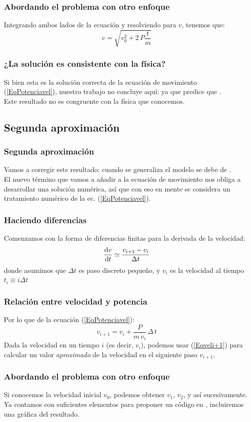 \documentclass[12pt]{beamer}
\begin{document}
\begin{frame}
\frametitle{Abordando el problema con otro enfoque}
Integrando ambos lados de la ecuación y resolviendo para $v$, tenemos que:
\pause
\begin{equation}\label{Eqvres}
v = \sqrt{v_{0}^{2} + 2 \, P \dfrac{t}{m}}
\end{equation}
\end{frame}
\begin{frame}
\frametitle{¿La solución es consistente con la física?}
Si bien esta es la solución correcta de la ecuación de movimiento (\ref{EqPotenciavel}), nuestro trabajo no concluye aquí: \pause ya que predice que .
\\
\bigskip
\pause
Este resultado no es congruente con la física que conocemos.
\end{frame}

\subsection{Segunda aproximación}

\begin{frame}
\frametitle{Segunda aproximación}
Vamos a corregir este resultado: cuando se generaliza el modelo se debe de .
\\
\bigskip
\pause
El nuevo término que vamos a añadir a la ecuación de movimiento nos obliga a desarrollar una solución numérica, así que con eso en mente se considera un tratamiento numérico de la ec. (\ref{EqPotenciavel}).
\end{frame}
\begin{frame}
\frametitle{Haciendo diferencias}
Comenzamos con la forma de diferencias finitas para la derivada de la velocidad:
\pause
\begin{equation}
\dv{v}{t} \simeq \dfrac{v_{i + 1} - v_{i}}{\Delta t}
\label{Eqderivada}
\end{equation}
donde asumimos que $\Delta t$ es paso discreto pequeño, y $v_{i}$ es la velocidad al tiempo $t_{i} \equiv i \Delta t$
\end{frame}
\begin{frame}
\frametitle{Relación entre velocidad y potencia}
Por lo que de la ecuación (\ref{EqPotenciavel}):
\pause
\begin{equation}
v_{i + 1} = v_{i} + \dfrac{P}{m \, v_{i}} \, \Delta \, t
\label{Eqveli+1}
\end{equation}
Dada la velocidad en un tiempo $i$ (es decir, $v_{i}$), podemos usar (\ref{Eqveli+1}) para calcular un valor \textit{aproximado} de la velocidad en el siguiente paso $v_{i+1}$.
\end{frame}
\begin{frame}
\frametitle{Abordando el problema con otro enfoque}
Si conocemos la velocidad inicial $v_{0}$, podemos obtener $v_{1}$, $v_{2}$, y así sucesivamente.
\\
\bigskip
\pause
Ya contamos con suficientes elementos para proponer un código en \python{}, incluiremos una gráfica del resultado.
\end{frame}
\end{document}
